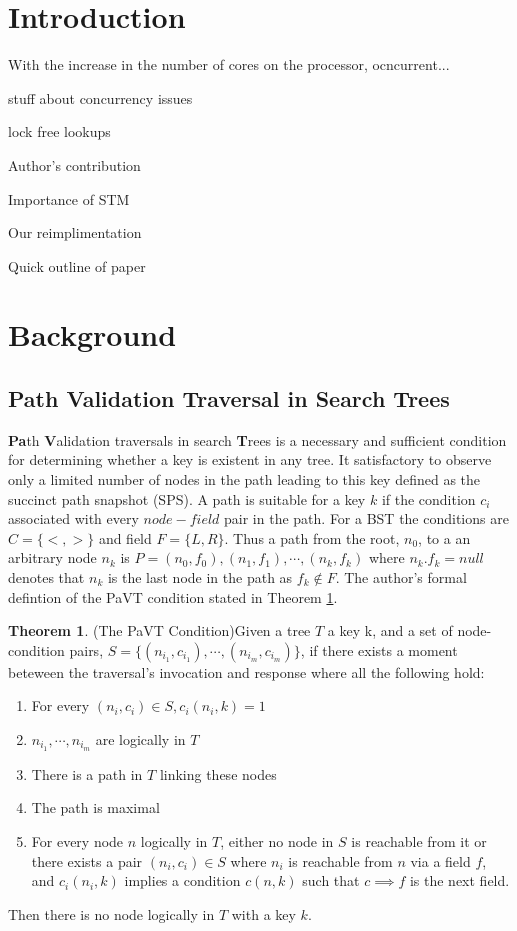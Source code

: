 \documentclass[11pt]{article}
\theoremstyle{definition}
\theoremstyle{theorem}
\newtheorem{theorem}{Theorem}[section]
\begin{document}
\section{Introduction}
With the increase in the number of cores on the processor, ocncurrent...

stuff about concurrency issues

lock free lookups

Author's contribution

Importance of STM

Our reimplimentation

Quick outline of paper
\section{Background}

\subsection{Path Validation Traversal in Search Trees}
\textbf{Pa}th \textbf{V}alidation traversals in search \textbf{T}rees is a necessary and sufficient condition for determining whether a key is existent in any tree. It satisfactory to observe only a limited number of nodes in the path leading to this key defined as the succinct path snapshot (SPS). A path is suitable for a key $k$ if the condition $c_i$ associated with every $node-field$ pair in the path. For a BST the conditions are $C=\{<,>\}$ and field $F=\{L, R\}$. Thus a path from the root, $n_0$, to a an arbitrary node $n_k$ is $P=(n_0, f_0), (n_1, f_1),\cdots, (n_k, f_k)$ where $n_k.f_k = null$ denotes that $n_k$ is the last node in the path as $f_k\not \in F$. The author's formal defintion of the PaVT condition stated in Theorem \ref{thm:pavt}.

\begin{theorem} {(The PaVT Condition)}\label{thm:pavt}
Given a tree $T$ a key k, and a set of node-condition pairs, $S=\{(n_{i_1}, c_{i_1}),\cdots, (n_{i_m}, c_{i_m})\}$, if there exists a moment beteween the traversal's invocation and response where all the following hold:
\begin{enumerate}
\item For every $(n_i, c_i) \in  S, c_i(n_i, k) = 1$
\item $n_{i_1},\cdots, n_{i_m}$ are logically in $T$
\item There is a path in $T$ linking these nodes
\item The path is maximal
\item For every node $n$ logically in $T$, either no node in $S$ is reachable from it or there exists a pair $(n_i, c_i)\in S$ where $n_i$ is reachable from $n$ via a field $f$, and $c_i(n_i, k)$ implies a condition $c(n, k)$ such that $c \implies f$ is the next field.
\end{enumerate}
Then there is no node logically in $T$ with a key $k$.
\end{theorem}
\end{document}
